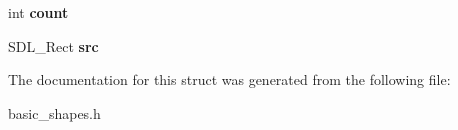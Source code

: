 \begin{DoxyCompactItemize}
\item 
\hypertarget{structERPG__Geometry__shape_acde465f118d1f2f44ac22f681210a280}{int {\bfseries count}}\label{structERPG__Geometry__shape_acde465f118d1f2f44ac22f681210a280}

\item 
\hypertarget{structERPG__Geometry__shape_a910b3c2b2dce1165da324f3baa4c8e0c}{S\-D\-L\-\_\-\-Rect {\bfseries src}}\label{structERPG__Geometry__shape_a910b3c2b2dce1165da324f3baa4c8e0c}

\end{DoxyCompactItemize}


The documentation for this struct was generated from the following file\-:\begin{DoxyCompactItemize}
\item 
basic\-\_\-shapes.\-h\end{DoxyCompactItemize}
